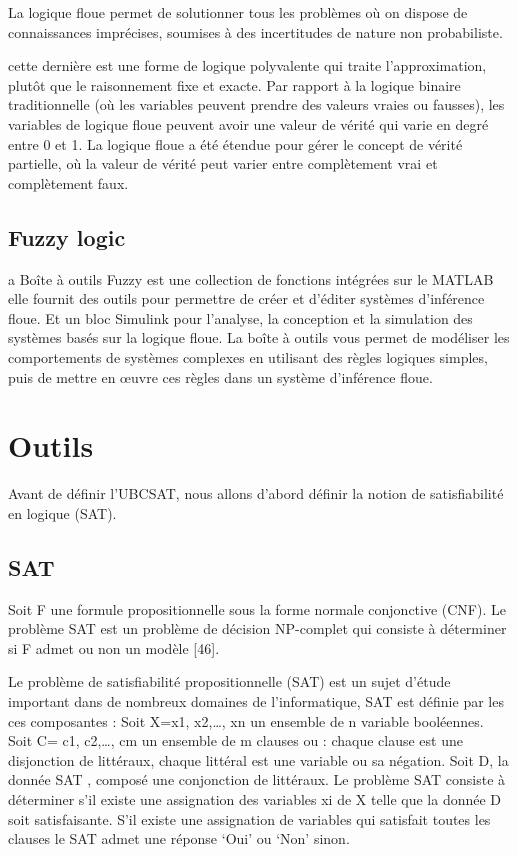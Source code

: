 La logique floue permet de solutionner tous les problèmes où on dispose de connaissances imprécises, soumises à des incertitudes de nature non probabiliste.

cette dernière est une forme de logique polyvalente qui traite l’approximation, plutôt que le raisonnement fixe et exacte. Par rapport à la logique binaire traditionnelle (où les variables peuvent prendre des valeurs vraies ou fausses), les variables de logique floue peuvent avoir une valeur de vérité qui varie en degré entre 0 et 1. La logique floue a été étendue pour gérer le concept de vérité partielle, où la valeur de vérité peut varier entre complètement vrai et complètement faux. 
\subsection{Fuzzy logic}

a Boîte à outils  Fuzzy est une collection de fonctions intégrées sur le MATLAB elle fournit des outils pour permettre de créer et d'éditer systèmes d'inférence floue. Et un bloc Simulink pour l'analyse, la conception et la simulation des systèmes basés sur la logique floue.
La boîte à outils vous permet de modéliser les comportements de systèmes complexes en utilisant des règles logiques simples, puis de mettre en œuvre ces règles dans un système d'inférence floue.

\section{Outils}

Avant de définir l’UBCSAT, nous allons d’abord définir la notion de satisfiabilité en logique (SAT). 
\subsection{SAT}
Soit F une formule propositionnelle sous la forme normale conjonctive (CNF). Le problème SAT est un problème de décision NP-complet qui consiste à déterminer si F admet ou non un modèle [46].

Le problème de satisfiabilité propositionnelle (SAT) est un sujet d'étude important dans de nombreux domaines de l'informatique, SAT est définie par les ces composantes :   
	Soit X={x1, x2,…, xn} un ensemble de n variable booléennes.
    Soit C= {c1, c2,…, cm} un ensemble de m clauses ou :
 	chaque clause est une disjonction de littéraux,
 	chaque littéral est une variable ou sa négation.
    Soit D, la donnée SAT	, composé une conjonction de littéraux.
Le problème SAT consiste à déterminer s’il existe une assignation des variables xi de X telle que la donnée D soit satisfaisante. S’il existe une assignation de variables qui satisfait toutes les clauses le SAT admet une réponse ‘Oui’ ou ‘Non’ sinon. 

